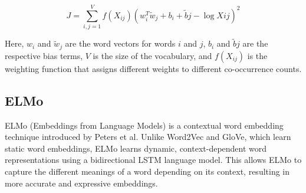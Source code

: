 \documentclass[12pt]{article}
\begin{document}
\begin{equation}
J = \sum_{i, j=1}^V f(X_{ij}) \left( w_i^T \tilde{w}_j + b_i + \tilde{b}j - \log X{ij} \right)^2
\end{equation}

Here, $w_i$ and $\tilde{w}_j$ are the word vectors for words $i$ and $j$, $b_i$ and $\tilde{b}j$ are the respective bias terms, $V$ is the size of the vocabulary, and $f(X_{ij})$ is the weighting function that assigns different weights to different co-occurrence counts.

\subsection{ELMo}

ELMo (Embeddings from Language Models) is a contextual word embedding technique introduced by Peters et al. Unlike Word2Vec and GloVe, which learn static word embeddings, ELMo learns dynamic, context-dependent word representations using a bidirectional LSTM language model. This allows ELMo to capture the different meanings of a word depending on its context, resulting in more accurate and expressive embeddings.
\end{document}
